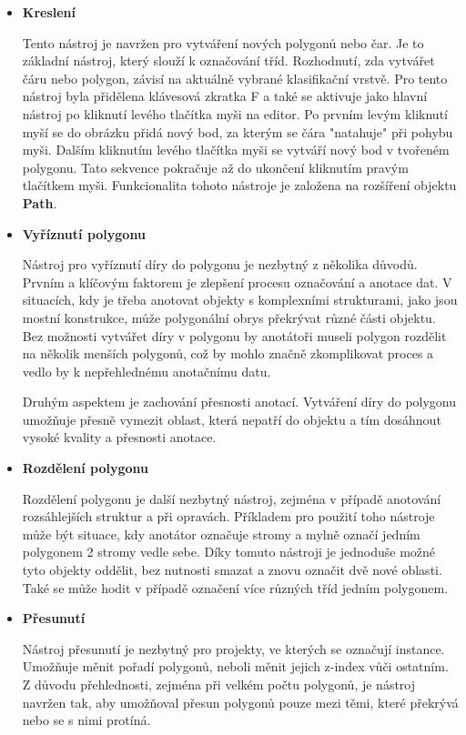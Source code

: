\begin{itemize}
  \item \textbf{Kreslení}
    
  Tento nástroj je navržen pro vytváření nových polygonů nebo čar. Je to základní nástroj, který slouží k označování tříd. Rozhodnutí, zda vytvářet čáru nebo polygon, závisí na aktuálně vybrané klasifikační vrstvě. Pro tento nástroj byla přidělena klávesová zkratka F a také se aktivuje jako hlavní nástroj po kliknutí levého tlačítka myši na editor. Po prvním levým kliknutí myší se do obrázku přidá nový bod, za kterým se čára "natahuje" při pohybu myši. Dalším kliknutím levého tlačítka myši se vytváří nový bod v tvořeném polygonu. Tato sekvence pokračuje až do ukončení kliknutím pravým tlačítkem myši. Funkcionalita tohoto nástroje je založena na rozšíření objektu \textbf{Path}.

  \item \textbf{Vyříznutí polygonu}
  
  Nástroj pro vyříznutí díry do polygonu je nezbytný z několika důvodů. Prvním a klíčovým faktorem je zlepšení procesu označování a anotace dat. V situacích, kdy je třeba anotovat objekty s komplexními strukturami, jako jsou mostní konstrukce, může polygonální obrys překrývat různé části objektu. Bez možnosti vytvářet díry v polygonu by anotátoři museli polygon rozdělit na několik menších polygonů, což by mohlo značně zkomplikovat proces a vedlo by k nepřehlednému anotačnímu datu.
  
  Druhým aspektem je zachování přesnosti anotací. Vytváření díry do polygonu umožňuje přesně vymezit oblast, která nepatří do objektu a tím dosáhnout vysoké kvality a přesnosti anotace. 

  \item \textbf{Rozdělení polygonu}
  
  Rozdělení polygonu je další nezbytný nástroj, zejména v případě anotování rozsáhlejších struktur a při opravách. Příkladem pro použití toho nástroje může být situace, kdy anotátor označuje stromy a mylně označí jedním polygonem 2 stromy vedle sebe. Díky tomuto nástroji je jednoduše možné tyto objekty oddělit, bez nutnosti smazat a znovu označit dvě nové oblasti. Také se může hodit v případě označení více různých tříd jedním polygonem.

  \item \textbf{Přesunutí}
  
  Nástroj přesunutí je nezbytný pro projekty, ve kterých se označují instance. Umožňuje měnit pořadí polygonů, neboli měnit jejich z-index vůči ostatním. Z důvodu přehlednosti, zejména při velkém počtu polygonů, je nástroj navržen tak, aby umožňoval přesun polygonů pouze mezi těmi, které překrývá nebo se s nimi protíná.
  

\end{itemize}
